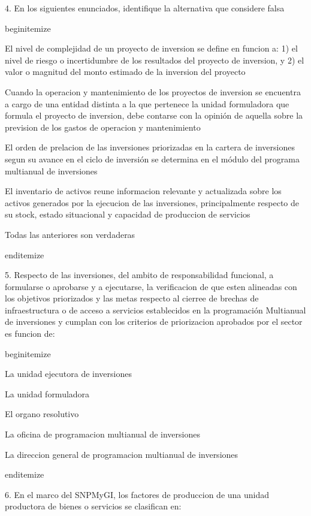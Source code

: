 4. En los siguientes enunciados, identifique la alternativa que considere falsa

begin{itemize} 
			\item El nivel de complejidad de un proyecto de inversion se define en funcion a: 1) el nivel de riesgo o incertidumbre de los resultados del proyecto de inversion, y 2) el valor o magnitud del monto estimado de la inversion del proyecto
			\item Cuando la operacion y mantenimiento de los proyectos de inversion se encuentra a cargo de una entidad distinta a la que pertenece la unidad formuladora que formula el proyecto de inversion, debe contarse con la opinión de aquella sobre la prevision de los gastos de operacion y mantenimiento
			\item El orden de prelacion de las inversiones priorizadas en la cartera de inversiones segun su avance  en el ciclo de inversión se determina en el módulo  del programa multianual de inversiones 
			\item El inventario de activos reune informacion relevante y actualizada sobre los activos generados por la ejecucion de las inversiones, principalmente respecto de su stock, estado situacional y capacidad de produccion de servicios 
			\item Todas las anteriores son verdaderas

end{itemize}

5. Respecto de las inversiones, del ambito de responsabilidad funcional, a formularse o aprobarse y a ejecutarse, la verificacion de que esten alineadas con los objetivos priorizados y las metas respecto al cierree de brechas de infraestructura o de acceso a servicios establecidos en la programación  Multianual  de inversiones y cumplan con los criterios de priorizacion aprobados por el sector es funcion de:

begin{itemize}
				\item La unidad ejecutora de inversiones
				\item La unidad formuladora
				\item El organo resolutivo
				\item La oficina de programacion multianual de inversiones
				\item La direccion general de programacion multianual de inversiones


end{itemize}

6. En el marco del SNPMyGI, los factores de produccion de una unidad productora de bienes o servicios se clasifican en:


